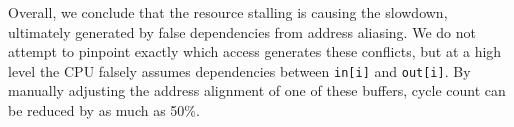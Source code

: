 \documentclass[10pt, conference, compsocconf]{IEEEtran}
\begin{document}
Overall, we conclude that the resource stalling is causing the slowdown, ultimately generated by false dependencies from address aliasing.
We do not attempt to pinpoint exactly which access generates these conflicts, but at a high level the CPU falsely assumes dependencies between \texttt{in[i]} and \texttt{out[i]}.
By manually adjusting the address alignment of one of these buffers, cycle count can be reduced by as much as 50\%.
\end{document}
